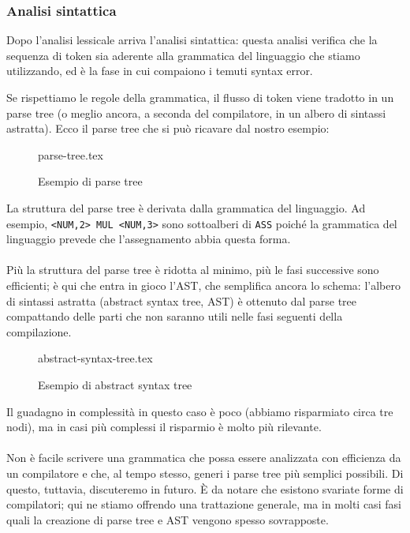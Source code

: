 \documentclass[class=book, crop=false, oneside, 12pt]{standalone}
\begin{document}
\subsubsection{Analisi sintattica}
Dopo l’analisi lessicale arriva l’analisi sintattica: questa analisi verifica che la sequenza di token sia aderente alla grammatica del linguaggio che stiamo utilizzando, ed è la fase in cui compaiono i temuti syntax error.

Se rispettiamo le regole della grammatica, il flusso di token viene tradotto in un parse tree (o meglio ancora, a seconda del compilatore, in un albero di sintassi astratta). Ecco il parse tree che si può ricavare dal nostro esempio:
\begin{figure}[H]
	\centering
	{parse-tree.tex}
	\caption{Esempio di parse tree}
\end{figure}
La struttura del parse tree è derivata dalla grammatica del linguaggio. Ad esempio, \texttt{<NUM,2> MUL <NUM,3>} sono sottoalberi di \texttt{ASS} poiché la grammatica del linguaggio prevede che l’assegnamento abbia questa forma. 

\paragraph{}
Più la struttura del parse tree è ridotta al minimo, più le fasi successive sono efficienti; è qui che entra in gioco l’AST, che semplifica ancora lo schema: l’albero di sintassi astratta (abstract syntax tree, AST) è ottenuto dal parse tree compattando delle parti che non saranno utili nelle fasi seguenti della compilazione.
\begin{figure}[H]
	\centering
	{abstract-syntax-tree.tex}
	\caption{Esempio di abstract syntax tree}
	\label{esempio_AST}
\end{figure}
Il guadagno in complessità in questo caso è poco (abbiamo risparmiato circa tre nodi), ma in casi più complessi il risparmio è molto più rilevante.
\paragraph*{}
Non è facile scrivere una grammatica che possa essere analizzata con efficienza da un compilatore e che, al tempo stesso, generi i parse tree più semplici possibili. Di questo, tuttavia, discuteremo in futuro. È da notare che esistono svariate forme di compilatori; qui ne stiamo offrendo una trattazione generale, ma in molti casi fasi quali la creazione di parse tree e AST vengono spesso sovrapposte.
\end{document}
